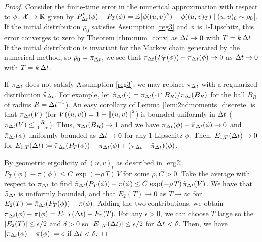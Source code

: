 \documentclass[11pt, twoside]{report}
\begin{document}
\begin{proof}
Consider the finite-time error in the numerical approximation with respect to $\phi\colon \mathcal X\to \mathbb{R}$ given by
$
P_{\tstep}^k(\phi)-P_{T}(\phi)
= \mean{
\phi((u,v)^k)-\phi((u,v)_T) \mid (u,v)_0\sim \rho_0}.
$
If the initial distribution $\rho_0$ satisfies Assumption \ref{reg3} and $\phi$ is $1$-Lipschitz,  this error converges to zero by Theorem \ref{thm:num_conv} as ${\Delta t}\to 0$ with $T=k\,{\Delta t}$. If the initial distribution is invariant for the Markov chain generated by the numerical method, so $\rho_0=\pi_{\Delta t}$, we see that
$\pi_{{\Delta t}}(P_{T}(\phi))-\pi_{\Delta t}(\phi)
\to 0$ as ${\Delta t}\to 0$ with $T=k\,{\Delta t}$.

If $\pi_{\Delta t}$ does not satisfy Assumption \ref{reg3}, we may replace $\pi_{\Delta t}$ with  a regularized distribution $\tilde \pi_{\Delta t}$. For example, let $\tilde{\pi}_{\Delta t}(\cdot)=\pi_{\Delta t}(\cdot \cap B_R) /\pi_{\Delta t}(B_R)$ for the ball $B_R$ of radius $R={\Delta t}^{-1}$). An easy corollary of Lemma \ref{lem:2ndmoments_discrete} is that  $\pi_{\Delta t}(V)$ (for $V((u,v))=1+\left\lVert(u,v)\right\rVert^2$) is bounded uniformly in ${\Delta t}$ ($\pi_{\Delta t}(V) \leq \frac{R}{1-\alpha}$). Thus, $\pi_{\Delta t}(B_R)\to 1$ and we have $\pi_{\Delta t}(\phi)-\tilde\pi_{\Delta t}(\phi)\to 0$ and $\tilde\pi_{\Delta t}(\phi)$ uniformly bounded as ${\Delta t}\to 0$ for any $1$-Lipschitz $\phi$. Then,  $E_{1,T}({\Delta t})\to 0$  for
$
E_{1,T}({\Delta t})\coloneq
\tilde\pi_{{\Delta t}}(P_{T}(\phi))-\pi_{\Delta t}(\phi)+(\pi_{\Delta t}-\tilde\pi_{\Delta t})(\phi)$.

By geometric ergodicity of $(u,v)_t$ as described in \ref{erg2},
$P_T(\phi) - \pi(\phi)\le C\,\exp(-\rho\,T) \,V$
for some $\rho,C>0$. 
Take the average with respect to $\tilde\pi_{\Delta t}$ to find
$\tilde\pi_{\Delta t}(P_T(\phi)) - \pi(\phi)\le C\,\exp(-\rho\,T) \,\tilde\pi_{\Delta t}(V)$.
We have that $\tilde\pi_{\Delta t}$ is uniformly bounded, and  that $E_2(T)\to 0$ as $T\to \infty$ for
$E_2(T)\coloneq \tilde\pi_{\Delta t}(P_T(\phi)) - \pi(\phi)$.
Adding the two contributions, we obtain
$
\pi_{{\Delta t}}(\phi)- \pi(\phi)= E_{1,T}({\Delta t})+E_2(T). $
For any $\epsilon>0$, we can choose $T$ large so the $\left\lvert E_2(T)\right\rvert\le \epsilon/2$ and $\delta>0$  so  $\left\lvert E_{1,T}({\Delta t})\right\rvert\le\epsilon/2$ for ${\Delta t}<\delta$. Then, we have 
$
|\pi_{{\Delta t}}(\phi)- \pi(\phi)|=\epsilon$ if ${\Delta t}<\delta$.
\end{proof}
\end{document}
